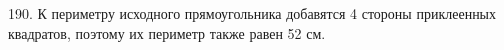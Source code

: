 190. К периметру исходного прямоугольника добавятся 4 стороны приклеенных квадратов, поэтому их периметр также равен 52 см.\\
